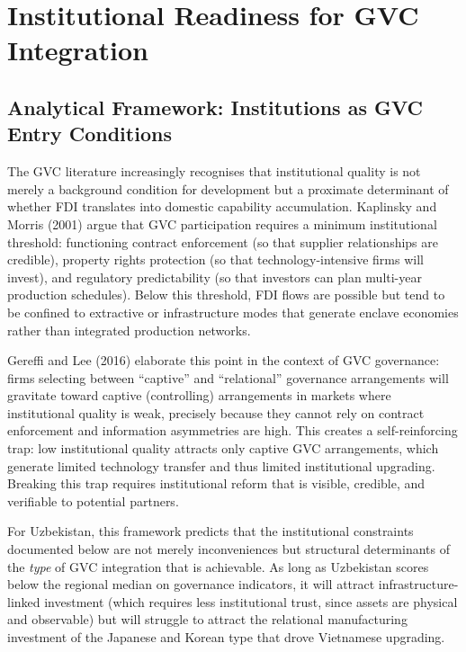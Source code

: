 \section{Institutional Readiness for GVC Integration}
\label{sec:institutional}

\subsection{Analytical Framework: Institutions as GVC Entry Conditions}

The GVC literature increasingly recognises that institutional quality is not merely a background condition for development but a proximate determinant of whether FDI translates into domestic capability accumulation. Kaplinsky and Morris (2001) argue that GVC participation requires a minimum institutional threshold: functioning contract enforcement (so that supplier relationships are credible), property rights protection (so that technology-intensive firms will invest), and regulatory predictability (so that investors can plan multi-year production schedules). Below this threshold, FDI flows are possible but tend to be confined to extractive or infrastructure modes that generate enclave economies rather than integrated production networks.

Gereffi and Lee (2016) elaborate this point in the context of GVC governance: firms selecting between ``captive'' and ``relational'' governance arrangements will gravitate toward captive (controlling) arrangements in markets where institutional quality is weak, precisely because they cannot rely on contract enforcement and information asymmetries are high. This creates a self-reinforcing trap: low institutional quality attracts only captive GVC arrangements, which generate limited technology transfer and thus limited institutional upgrading. Breaking this trap requires institutional reform that is visible, credible, and verifiable to potential partners.

For Uzbekistan, this framework predicts that the institutional constraints documented below are not merely inconveniences but structural determinants of the \textit{type} of GVC integration that is achievable. As long as Uzbekistan scores below the regional median on governance indicators, it will attract infrastructure-linked investment (which requires less institutional trust, since assets are physical and observable) but will struggle to attract the relational manufacturing investment of the Japanese and Korean type that drove Vietnamese upgrading.

